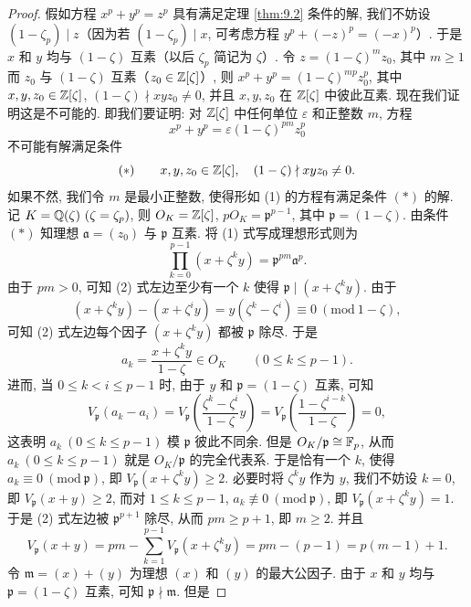 \begin{proof}
假如方程 $x^p+y^p=z^p$ 具有满足定理 \ref{thm:9.2} 条件的解, 我们不妨设 $(1-\zeta_p)\mid z$（因为若 $(1-\zeta_p)\mid x$, 可考虑方程 $y^p+(-z)^p=(-x)^p$）. 于是 $x$ 和 $y$ 均与 $(1-\zeta)$ 互素（以后 $\zeta_p$ 简记为 $\zeta$）. 令 $z=(1-\zeta)^mz_0$, 其中 $m\geqslant 1$ 而 $z_0$ 与 $(1-\zeta)$ 互素（$z_0\in\mathbb{Z}[\zeta]$）, 则 $x^p+y^p=(1-\zeta)^{mp}z_0^p$, 其中 $x,y,z_0\in\mathbb{Z}[\zeta]$, $(1-\zeta)\nmid xyz_0\neq 0$, 并且 $x,y,z_0$ 在 $\mathbb{Z}[\zeta]$ 中彼此互素. 现在我们证明这是不可能的. 即我们要证明: 对 $\mathbb{Z}[\zeta]$ 中任何单位 $\varepsilon$ 和正整数 $m$, 方程
\begin{equation}\tag{1}
  x^p+y^p=\varepsilon(1-\zeta)^{pm}z_0^p
\end{equation}
不可能有解满足条件
\[
  (*)\qquad x,y,z_0\in\mathbb{Z}[\zeta],\quad (1-\zeta)\nmid xyz_0\neq 0.
\]
如果不然, 我们令 $m$ 是最小正整数, 使得形如 (1) 的方程有满足条件 $(*)$ 的解. 记 $K=\Q(\zeta)\ (\zeta=\zeta_p)$, 则 $O_K=\mathbb{Z}[\zeta]$, $pO_K=\mathfrak{p}^{p-1}$, 其中 $\mathfrak{p}=(1-\zeta)$. 由条件 $(*)$ 知理想 $\mathfrak{a}=(z_0)$ 与 $\mathfrak{p}$ 互素. 将 (1) 式写成理想形式则为
\begin{equation}\tag{2}
  \prod_{k=0}^{p-1}(x+\zeta^ky)=\mathfrak{p}^{pm}\mathfrak{a}^p.
\end{equation}
由于 $pm>0$, 可知 (2) 式左边至少有一个 $k$ 使得 $\mathfrak{p}\mid(x+\zeta^ky)$. 由于
\[
  (x+\zeta^ky)-(x+\zeta^iy)=y(\zeta^k-\zeta^i)\equiv 0\ (\mathrm{mod}\ 1-\zeta),
\]
可知 (2) 式左边每个因子 $(x+\zeta^ky)$ 都被 $\mathfrak{p}$ 除尽. 于是
\[
  a_k=\frac{x+\zeta^ky}{1-\zeta}\in O_K\qquad(0\leqslant k\leqslant p-1).
\]
进而, 当 $0\leqslant k<i\leqslant p-1$ 时, 由于 $y$ 和 $\mathfrak{p}=(1-\zeta)$ 互素, 可知
\[
  V_{\mathfrak{p}}(a_k-a_i)=V_{\mathfrak{p}}\left(\frac{\zeta^k-\zeta^i}{1-\zeta}y\right)
  =V_{\mathfrak{p}}\left(\frac{1-\zeta^{i-k}}{1-\zeta}\right)=0,
\]
这表明 $a_k\ (0\leqslant k\leqslant p-1)$ 模 $\mathfrak{p}$ 彼此不同余. 但是 $O_K/\mathfrak{p}\cong\mathbb{F}_p$, 从而 $a_k\ (0\leqslant k\leqslant p-1)$ 就是 $O_K/\mathfrak{p}$ 的完全代表系. 于是恰有一个 $k$, 使得 $a_k\equiv 0\ (\mathrm{mod}\ \mathfrak{p})$, 即 $V_{\mathfrak{p}}(x+\zeta^ky)\geqslant 2$. 必要时将 $\zeta^ky$ 作为 $y$, 我们不妨设 $k=0$, 即 $V_{\mathfrak{p}}(x+y)\geqslant 2$, 而对 $1\leqslant k\leqslant p-1$, $a_k\not\equiv 0\ (\mathrm{mod}\ \mathfrak{p})$, 即 $V_{\mathfrak{p}}(x+\zeta^ky)=1$. 于是 (2) 式左边被 $\mathfrak{p}^{p+1}$ 除尽, 从而 $pm\geqslant p+1$, 即 $m\geqslant 2$. 并且
\[
  V_{\mathfrak{p}}(x+y)=pm-\sum_{k=1}^{p-1}V_{\mathfrak{p}}(x+\zeta^ky)
  =pm-(p-1)=p(m-1)+1.
\]
令 $\mathfrak{m}=(x)+(y)$ 为理想 $(x)$ 和 $(y)$ 的最大公因子. 由于 $x$ 和 $y$ 均与 $\mathfrak{p}=(1-\zeta)$ 互素, 可知 $\mathfrak{p}\nmid\mathfrak{m}$. 但是

\end{proof}
